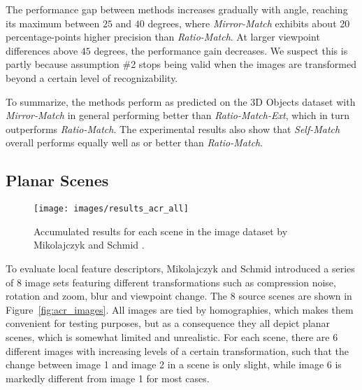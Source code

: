 \documentclass[10pt,journal,cspaper,compsoc]{IEEEtran}
\begin{document}
The performance gap between methods increases gradually with angle, reaching its maximum between $25$ and $40$ degrees, 
where \emph{Mirror-Match} exhibits about 20 percentage-points higher precision than \emph{Ratio-Match}. 
At larger viewpoint differences above $45$ degrees, the performance gain decreases.  We suspect this is partly because assumption \#2 stops being valid when the images are transformed beyond 
a certain level of recognizability.

To summarize, the methods perform as predicted on the 3D Objects dataset
with \emph{Mirror-Match} in general performing better than 
\emph{Ratio-Match-Ext}, which in turn outperforms
\emph{Ratio-Match}. The experimental results also show that 
\emph{Self-Match} overall performs equally well as or better than 
\emph{Ratio-Match}.

\subsection{Planar Scenes}
\label{S:Planar}

\begin{figure*}[t!]
	\centering
    \texttt{[image: images/results\_acr\_all]}
    \caption{Accumulated results for each scene in the image dataset by 
    Mikolajczyk and Schmid \cite{mikolajczyk2005performance}.}
    \label{fig:acr_objects}
\end{figure*}


To evaluate local feature descriptors, Mikolajczyk and Schmid \cite{mikolajczyk2005performance} introduced
a series of $8$ image sets featuring different transformations such as 
compression noise, rotation and zoom, blur and viewpoint change. The 8 source scenes are shown in Figure~\ref{fig:acr_images}.  
All  images are tied by homographies, which makes them convenient for testing 
purposes, but as a consequence they all depict planar scenes, which is 
somewhat limited and unrealistic. For each scene, there are 6 different 
images with increasing levels of a certain transformation, such that 
the change between image 1 and image 2 in a scene is only slight, while image 6 is markedly different from image 1 for most cases.
\end{document}
